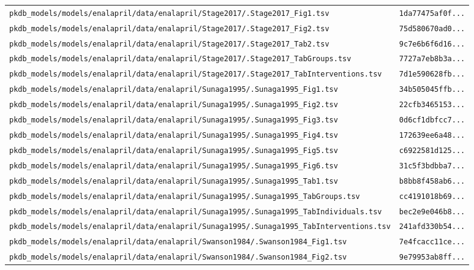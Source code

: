 \documentclass{article}
\begin{document}
\begin{longtable}{ll}
\texttt{pkdb\_models/models/enalapril/data/enalapril/Stage2017/.Stage2017\_Fig1.tsv} & \texttt{1da77475af0f...} \\
\texttt{pkdb\_models/models/enalapril/data/enalapril/Stage2017/.Stage2017\_Fig2.tsv} & \texttt{75d580670ad0...} \\
\texttt{pkdb\_models/models/enalapril/data/enalapril/Stage2017/.Stage2017\_Tab2.tsv} & \texttt{9c7e6b6f6d16...} \\
\texttt{pkdb\_models/models/enalapril/data/enalapril/Stage2017/.Stage2017\_TabGroups.tsv} & \texttt{7727a7eb8b3a...} \\
\texttt{pkdb\_models/models/enalapril/data/enalapril/Stage2017/.Stage2017\_TabInterventions.tsv} & \texttt{7d1e590628fb...} \\
\texttt{pkdb\_models/models/enalapril/data/enalapril/Sunaga1995/.Sunaga1995\_Fig1.tsv} & \texttt{34b505045ffb...} \\
\texttt{pkdb\_models/models/enalapril/data/enalapril/Sunaga1995/.Sunaga1995\_Fig2.tsv} & \texttt{22cfb3465153...} \\
\texttt{pkdb\_models/models/enalapril/data/enalapril/Sunaga1995/.Sunaga1995\_Fig3.tsv} & \texttt{0d6cf1dbfcc7...} \\
\texttt{pkdb\_models/models/enalapril/data/enalapril/Sunaga1995/.Sunaga1995\_Fig4.tsv} & \texttt{172639ee6a48...} \\
\texttt{pkdb\_models/models/enalapril/data/enalapril/Sunaga1995/.Sunaga1995\_Fig5.tsv} & \texttt{c6922581d125...} \\
\texttt{pkdb\_models/models/enalapril/data/enalapril/Sunaga1995/.Sunaga1995\_Fig6.tsv} & \texttt{31c5f3bdbba7...} \\
\texttt{pkdb\_models/models/enalapril/data/enalapril/Sunaga1995/.Sunaga1995\_Tab1.tsv} & \texttt{b8bb8f458ab6...} \\
\texttt{pkdb\_models/models/enalapril/data/enalapril/Sunaga1995/.Sunaga1995\_TabGroups.tsv} & \texttt{cc4191018b69...} \\
\texttt{pkdb\_models/models/enalapril/data/enalapril/Sunaga1995/.Sunaga1995\_TabIndividuals.tsv} & \texttt{bec2e9e046b8...} \\
\texttt{pkdb\_models/models/enalapril/data/enalapril/Sunaga1995/.Sunaga1995\_TabInterventions.tsv} & \texttt{241afd330b54...} \\
\texttt{pkdb\_models/models/enalapril/data/enalapril/Swanson1984/.Swanson1984\_Fig1.tsv} & \texttt{7e4fcacc11ce...} \\
\texttt{pkdb\_models/models/enalapril/data/enalapril/Swanson1984/.Swanson1984\_Fig2.tsv} & \texttt{9e79953ab8ff...} \\

\end{longtable}
\end{document}
